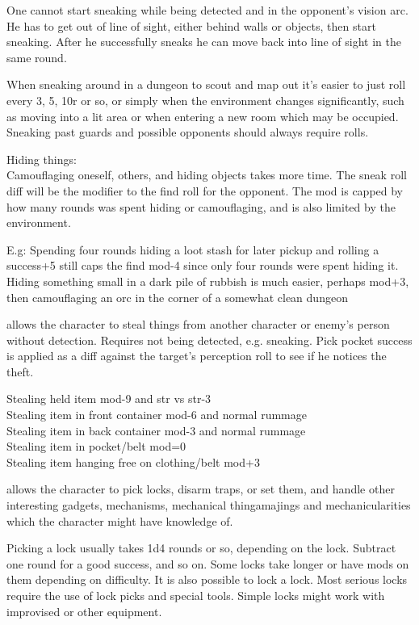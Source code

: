 One cannot start sneaking while being detected and in the opponent's vision arc. He has to get out of line of sight, either behind walls or objects, then start sneaking. After he successfully sneaks he can move back into line of sight in the same round.

When sneaking around in a dungeon to scout and map out it's easier to just roll every 3, 5, 10r or so, or simply when the environment changes significantly, such as moving into a lit area or when entering a new room which may be occupied. Sneaking past guards and possible opponents should always require rolls.

Hiding things:\\
Camouflaging oneself, others, and hiding objects takes more time. The sneak roll diff will be the modifier to the find roll for the opponent. The mod is capped by how many rounds was spent hiding or camouflaging, and is also limited by the environment.

E.g: Spending four rounds hiding a loot stash for later pickup and rolling a success+5 still caps the find mod-4 since only four rounds were spent hiding it.
Hiding something small in a dark pile of rubbish is much easier, perhaps mod+3, then camouflaging an orc in the corner of a somewhat clean dungeon


 allows the character to steal things from another character or enemy's person without detection. Requires not being detected, e.g. sneaking. Pick pocket success is applied as a diff against the target's perception roll to see if he notices the theft.

Stealing held item mod-9 and str vs str-3 \\
Stealing item in front container mod-6 and normal rummage \\
Stealing item in back container mod-3 and normal rummage \\
Stealing item in pocket/belt mod=0 \\
Stealing item hanging free on clothing/belt mod+3


 allows the character to pick locks, disarm traps, or set them, and handle other interesting gadgets, mechanisms, mechanical thingamajings and mechanicularities which the character might have knowledge of.

Picking a lock usually takes 1d4 rounds or so, depending on the lock. Subtract one round for a good success, and so on. Some locks take longer or have mods on them depending on difficulty. It is also possible to lock a lock.
Most serious locks require the use of lock picks and special tools. Simple locks might work with improvised or other equipment.

